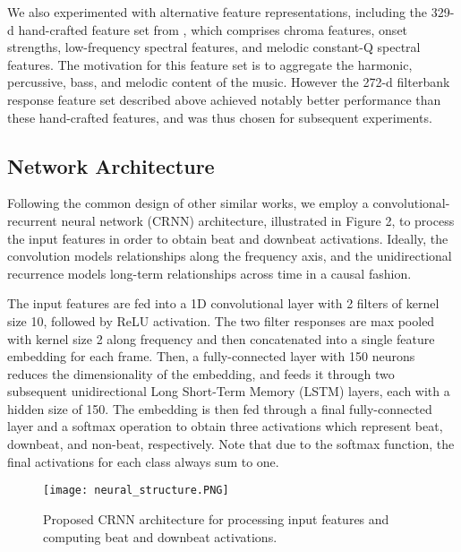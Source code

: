 \documentclass{article}
\begin{document}
We also experimented with alternative feature representations, including the 329-d hand-crafted feature set from \cite{durand:1}, which comprises chroma features, onset strengths, low-frequency spectral features, and melodic constant-Q spectral features. The motivation for this feature set is to aggregate the harmonic, percussive, bass, and melodic content of the music. However the 272-d filterbank response feature set described above achieved notably better performance than these hand-crafted features, and was thus chosen for subsequent experiments.

\subsection{Network Architecture}
Following the common design of other similar works, we employ a convolutional-recurrent neural network (CRNN) architecture, illustrated in Figure 2, to process the input features in order to obtain beat and downbeat activations. Ideally, the convolution models relationships along the frequency axis, and the unidirectional recurrence models long-term relationships across time in a causal fashion.

The input features are fed into a 1D convolutional layer with 2 filters of kernel size 10, followed by ReLU activation. The two filter responses are max pooled with kernel size 2 along frequency and then concatenated into a single feature embedding for each frame.
Then, a fully-connected layer with 150 neurons reduces the dimensionality of the embedding, and feeds it through two subsequent unidirectional Long Short-Term Memory (LSTM) layers, each with a hidden size of 150. The embedding is then fed through a final fully-connected layer and a softmax operation to obtain three activations which represent beat, downbeat, and non-beat, respectively. Note that due to the softmax function, the final activations for each class always sum to one.



\begin{figure}[htbp]
 \centerline{
 \texttt{[image: neural\_structure.PNG]}}
 \caption{Proposed CRNN architecture for processing input features and computing beat and downbeat activations.}
 \label{fig2}
\end{figure}
\end{document}
